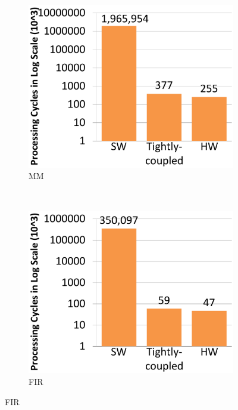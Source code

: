 \begin{figure}
    \centering
    \begin{subfigure}{0.23\textwidth}
        \includegraphics[width=\textwidth]{MM}
        \caption{MM}
        \label{fig:MM}
    \end{subfigure}
    ~ %
    \begin{subfigure}{0.23\textwidth}
        \includegraphics[width=\textwidth]{Fir}
        \caption{FIR}
        \label{fig:FIR}
    \end{subfigure}
    

\end{figure}
